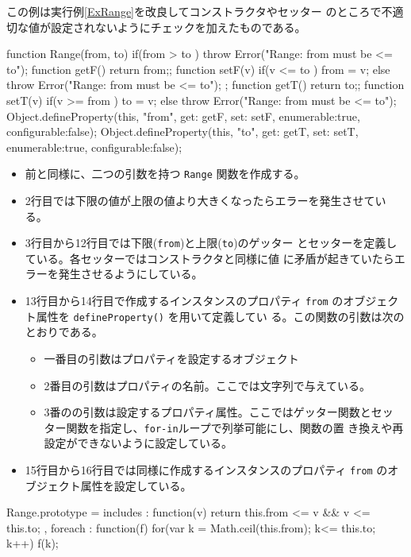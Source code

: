 \begin{Exec}\label{ExRange2}\upshape
この例は実行例\ref{ExRange}を改良してコンストラクタやセッター
 のところで不適切な値が設定されないようにチェックを加えたものである。
\begin{listing}{1}
function Range(from, to) {
  if(from > to ) throw Error("Range: from must be <= to");
  function getF() { return from;};
  function setF(v) {
    if(v <= to ) from = v;
    else throw Error("Range: from must be <= to");
  };
  function getT() {return to;};
  function setT(v) {
    if(v >= from ) to = v;
    else throw Error("Range: from must be <= to");
  }
  Object.defineProperty(this, "from",
    {get: getF, set: setF, enumerable:true, configurable:false});
  Object.defineProperty(this, "to",
    {get: getT, set: setT, enumerable:true, configurable:false});
}
\end{listing}
\begin{itemize}
 \item 前と同様に、二つの引数を持つ \texttt{Range} 関数を作成する。
 \item 2行目では下限の値が上限の値より大きくなったらエラーを発生させてい
       る。
 \item 3行目から12行目では下限(\texttt{from})と上限(\texttt{to})のゲッター
       とセッターを定義している。各セッターではコンストラクタと同様に値
       に矛盾が起きていたらエラーを発生させるようにしている。
 \item 13行目から14行目で作成するインスタンスのプロパティ \texttt{from}
       のオブジェクト属性を \texttt{defineProperty()} を用いて定義してい
       る。この関数の引数は次のとおりである。
 \begin{itemize}
  \item 一番目の引数はプロパティを設定するオブジェクト
  \item 2番目の引数はプロパティの名前。ここでは文字列で与えている。
  \item 3番のの引数は設定するプロパティ属性。ここではゲッター関数とセッ
	ター関数を指定し、\texttt{for-in}ループで列挙可能にし、関数の置
	き換えや再設定ができないように設定している。
 \end{itemize} 
 \item 15行目から16行目では同様に作成するインスタンスのプロパティ \texttt{from}
       のオブジェクト属性を設定している。
\end{itemize}
\begin{listingcont}
Range.prototype = {
  includes : function(v) {
    return this.from <= v && v <= this.to;
  },
  foreach : function(f) {
    for(var k = Math.ceil(this.from); k<= this.to; k++) f(k);
}}
\end{listingcont}
\end{Exec}
